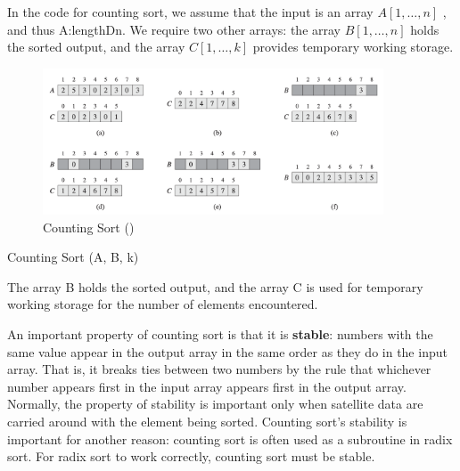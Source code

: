 In the code for counting sort, we assume that the input is an array $A[1,\dots,n]$ , and
thus A:lengthDn. We require two other arrays: the array $B[1,\dots,n]$ holds the
sorted output, and the array $C[1,\dots,k]$ provides temporary working storage.

\begin{figure}[H]
    \centering
    \includegraphics[width=0.9\textwidth]{assets/countingsort.png}
    \caption{Counting Sort (\cite{cormen2022introduction})}
\end{figure}

\begin{algorithm}[H]
    \caption{Counting Sort (A, B, k)}
\end{algorithm}


The array B holds the sorted output, and the array C is used for temporary working storage for the number of elements encountered. 

An important property of counting sort is that it is \textbf{stable}: numbers with the same
value appear in the output array in the same order as they do in the input array. That
is, it breaks ties between two numbers by the rule that whichever number appears
first in the input array appears first in the output array. Normally, the property of
stability is important only when satellite data are carried around with the element
being sorted. Counting sort’s stability is important for another reason: counting
sort is often used as a subroutine in radix sort. For radix sort to work correctly, counting sort must be stable.

